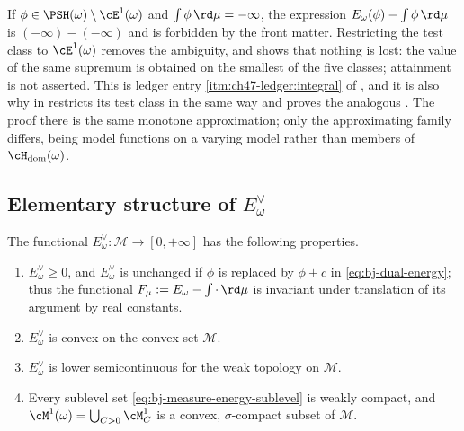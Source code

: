 \begin{remark}
\label{rem:ch47-why-e1-test}
If $\phi\in\PSH(\omega)\setminus\cE^1(\omega)$ and
$\int\phi\,\rd\mu=-\infty$, the expression
$E_\omega(\phi)-\int\phi\,\rd\mu$ is $(-\infty)-(-\infty)$ and is
forbidden by the front matter.  Restricting the test class to
$\cE^1(\omega)$ removes the ambiguity, and
 shows that nothing is lost: the value of the
same supremum is obtained on the smallest of the five classes;
attainment is not asserted.  This is
ledger entry \cref{itm:ch47-ledger:integral} of , and
it is also why  in  restricts
its test class in the same way and proves the analogous
.  The proof there is the same monotone
approximation; only the approximating family differs, being model
functions on a varying model rather than members of
$\cH_{\mathrm{dom}}(\omega)$.
\end{remark}

\subsection{Elementary structure of \texorpdfstring{$E^\vee_\omega$}{the dual energy}}
\label{sec:ch47-dual-elementary}

\begin{proposition}
\label{prop:ch47-dual-elementary}
The functional $E^\vee_\omega:\mathcal M\to[0,+\infty]$ has the following
properties.
\begin{enumerate}
\item\label{itm:ch47-dual:nonneg}
      $E^\vee_\omega\ge0$, and $E^\vee_\omega$ is unchanged if
      $\phi$ is replaced by $\phi+c$ in
      \eqref{eq:bj-dual-energy}; thus the functional
      $F_\mu:=E_\omega-\int\cdot\,\rd\mu$ is invariant under translation
      of its argument by real constants.
\item\label{itm:ch47-dual:convex}
      $E^\vee_\omega$ is convex on the convex set $\mathcal M$.
\item\label{itm:ch47-dual:lsc}
      $E^\vee_\omega$ is lower semicontinuous for the weak topology on
      $\mathcal M$.
\item\label{itm:ch47-dual:compact}
      Every sublevel set \eqref{eq:bj-measure-energy-sublevel} is weakly
      compact, and $\cM^1(\omega)=\bigcup_{C>0}\cM^1_C$ is a convex,
      $\sigma$-compact subset of $\mathcal M$.
\end{enumerate}
\end{proposition}

